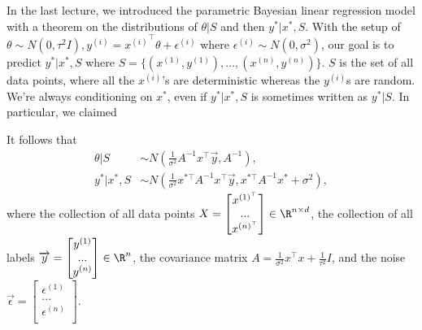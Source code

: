 
\setcounter{section}{0}


In the last lecture, we introduced the parametric Bayesian linear regression model with a theorem on the distributions of $\theta | S$ and then $y^* | x^* , S$. With the setup of $\theta \sim N(0, \tau^2 I), y^{(i)} = {x^{(i)}}^\top \theta + \epsilon^{(i)}$ where $\epsilon^{(i)} \sim N(0, \sigma^2)$, our goal is to predict $y^* | x^*, S$ where $S = \{(x^{(1)}, y^{(1)}), ..., (x^{(n)}, y^{(n)})\}$. $S$ is the set of all data points, where all the $x^{(i)}$'s are deterministic whereas the $y^{(i)}$s are random. We're always conditioning on $x^*$, even if $y^* | x^*, S$ is sometimes written as $y^* | S$.  In particular, we claimed
\begin{theorem} \label{thm:nonpara}
		It follows that
		\begin{align}
		\theta | S &\sim N(\frac{1}{\sigma^2} A^{-1} x^\top \overrightarrow{y}, A^{-1}), \\
		y^* | x^*, S &\sim N(\frac{1}{\sigma^2} x^{*\top} A^{-1} x^\top \overrightarrow{y}, x^{*\top} A^{-1} x^* + \sigma^2), \label{eq:claim-two}
		\end{align}
		where the collection of all data points 
		$X = \begin{bmatrix}
			x^{(1)^\top} \\
			...\\
			x^{(n)^\top} \\
		\end{bmatrix}
		\in \R^{n \times d}$, the collection of all labels $\overrightarrow{y} = 
		\begin{bmatrix}
			y^{(1)} \\
			...\\
			y^{(n)}\\
		\end{bmatrix}
		\in \R^n$, the covariance matrix $A = \frac{1}{\sigma^2} x^\top x + \frac{1}{\tau^2} I$, and the noise $\overrightarrow{\epsilon} =  %
		\begin{bmatrix}
			\epsilon^{(1)} \\
			... \\
			\epsilon^{(n)} \\
		\end{bmatrix}.$
\end{theorem}

